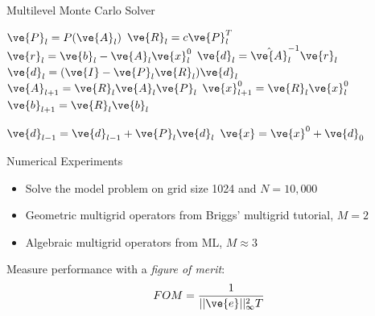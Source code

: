 \documentclass{beamer}
\begin{document}
\begin{frame}[fragile]{Multilevel Monte Carlo Solver}
  
  \vspace{-0.15in}

  \begin{algorithm}[H]
    \caption{\small Multilevel Monte Carlo Method}
    \label{alg:mlamc}
    \begin{algorithmic}[1]
      { \small
        \STATE  $\ve{P}_l = P(\ve{A}_l)$
        \STATE $\ve{R}_l = c \ve{P}_l^T$
        \STATE $\ve{r}_l = \ve{b}_l - \ve{A}_l \ve{x}_l^0$
        \STATE $\ve{d}_l = \hat{\ve{A}}_l^{-1} \ve{r}_l$
        \STATE $\ve{d}_l = (\ve{I} - \ve{P}_l\ve{R}_l) \ve{d}_{l}$
        \STATE $\ve{A}_{l+1} = \ve{R}_l \ve{A}_l \ve{P}_l$
        \STATE $\ve{x}_{l+1}^0 = \ve{R}_l \ve{x}_l^0$
        \STATE $\ve{b}_{l+1} = \ve{R}_l \ve{b}_l$
        \ENDIF
        \ENDFOR

        \STATE $\ve{d}_{l-1} = \ve{d}_{l-1} + \ve{P}_{l} \ve{d}_{l}$
        \ENDFOR
        \STATE $\ve{x} = \ve{x}^0 + \ve{d}_0$
      }
    \end{algorithmic}
  \end{algorithm}

\end{frame}

\begin{frame}{Numerical Experiments}

  \begin{itemize}
  \item Solve the model problem on grid size 1024 and $N = 10,000$
    \medskip
  \item Geometric multigrid operators from Briggs' multigrid tutorial,
    $M = 2$
    \medskip
  \item Algebraic multigrid operators from ML, $M \approx 3$
  \end{itemize}

  \bigskip
  Measure performance with a \textit{figure of merit}:
  \[
  FOM = \frac{1}{||\ve{e}||^2_{\infty} T}
  \]

\end{frame}
\end{document}
